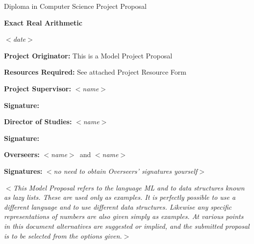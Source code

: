 \documentclass[12pt]{article}
\newcommand{\al}{$<$}
\newcommand{\ar}{$>$}
\begin{document}
\thispagestyle{empty}

\rightline{\large\al\emph{name}\ar}
\medskip
\rightline{\large\al\emph{College}\ar}
\medskip
\rightline{\large\al\emph{CRSID}\ar}

\vfil

\centerline{\large Diploma in Computer Science Project Proposal}
\vspace{0.4in}
\centerline{\Large\bf Exact Real Arithmetic}
\vspace{0.3in}
\centerline{\large \al\emph{date}\ar}

\vfil

{\bf Project Originator:} This is a Model Project Proposal

\vspace{0.1in}

{\bf Resources Required:} See attached Project Resource Form

\vspace{0.5in}

{\bf Project Supervisor:} \al\emph{name}\ar

\vspace{0.2in}

{\bf Signature:}

\vspace{0.5in}

{\bf Director of Studies:}  \al\emph{name}\ar

\vspace{0.2in}

{\bf Signature:}

\vspace{0.5in}

{\bf Overseers:} \al\emph{name}\ar\ and \al\emph{name}\ar

\vspace{0.2in}

{\bf Signatures:} \al\emph{no need to obtain Overseers' signatures yourself}\ar

\vfil
\eject



\al\emph{This Model Proposal refers to the language ML and to data
  structures known as lazy lists.  These are used only as examples.
  It is perfectly possible to use a different language and to use
  different data structures.  Likewise any specific representations of
  numbers are also given simply as examples.  At various points in
  this document\/ {\rm alternatives} are suggested or implied, and the
  submitted proposal is to be selected from the options given.}\ar
\end{document}
